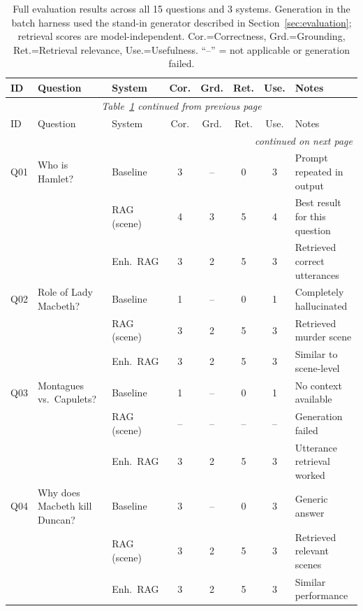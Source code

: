 \renewcommand{\arraystretch}{1.15}
\begin{longtable}{@{}p{0.7cm} p{4.3cm} p{2.5cm} c c c c p{4.2cm}@{}}
\caption{Full evaluation results across all 15 questions and 3 systems.
Generation in the batch harness used the stand-in generator described in
Section~\ref{sec:evaluation}; retrieval scores are model-independent.
Cor.=Correctness, Grd.=Grounding, Ret.=Retrieval relevance,
Use.=Usefulness. ``--'' = not applicable or generation failed.}
\label{tab:full-eval}\\
\toprule
ID & Question & System & Cor. & Grd. & Ret. & Use. & Notes \\
\midrule
\endfirsthead
\multicolumn{8}{c}{\footnotesize\itshape Table~\ref{tab:full-eval} continued from previous page}\\
\toprule
ID & Question & System & Cor. & Grd. & Ret. & Use. & Notes \\
\midrule
\endhead
\midrule \multicolumn{8}{r}{\footnotesize\itshape continued on next page}\\
\endfoot
\bottomrule
\endlastfoot
Q01 & Who is Hamlet? & Baseline   & 3 & -- & 0 & 3 & Prompt repeated in output \\
    &                & RAG (scene)& 4 & 3  & 5 & 4 & Best result for this question \\
    &                & Enh.\ RAG  & 3 & 2  & 5 & 3 & Retrieved correct utterances \\
\midrule
Q02 & Role of Lady Macbeth? & Baseline   & 1 & -- & 0 & 1 & Completely hallucinated \\
    &                       & RAG (scene)& 3 & 2  & 5 & 3 & Retrieved murder scene \\
    &                       & Enh.\ RAG  & 3 & 2  & 5 & 3 & Similar to scene-level \\
\midrule
Q03 & Montagues vs.\ Capulets? & Baseline   & 1 & -- & 0 & 1 & No context available \\
    &                          & RAG (scene)& -- & -- & -- & -- & Generation failed \\
    &                          & Enh.\ RAG  & 3 & 2  & 5 & 3 & Utterance retrieval worked \\
\midrule
Q04 & Why does Macbeth kill Duncan? & Baseline   & 3 & -- & 0 & 3 & Generic answer \\
    &                               & RAG (scene)& 3 & 2  & 5 & 3 & Retrieved relevant scenes \\
    &                               & Enh.\ RAG  & 3 & 2  & 5 & 3 & Similar performance \\

\end{longtable}
